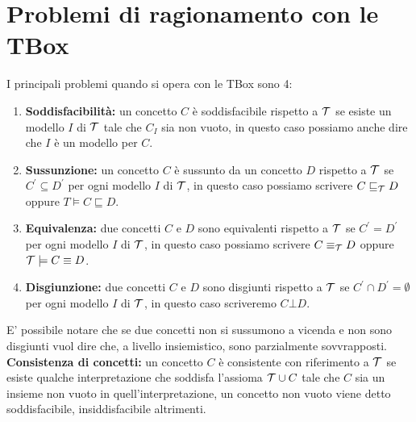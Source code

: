 \documentclass[../main.tex]{subfiles}
\begin{document}
   \section{Problemi di ragionamento con le TBox}
   I principali problemi quando si opera con le TBox sono 4:
   \begin{enumerate}
      \item \textbf{Soddisfacibilità:} un concetto $C$ è soddisfacibile rispetto a $\mathcal{T}$ se esiste un modello $I$ di $\mathcal{T}$ tale che $C_I$ sia non vuoto, in questo caso possiamo anche dire che $I$ è un modello per $C$.
      \item \textbf{Sussunzione:} un concetto $C$ è sussunto da un concetto $D$ rispetto a $\mathcal{T}$ se $C^\prime \subseteq D^\prime$ per ogni modello $I$ di $\mathcal{T}$, in questo caso possiamo scrivere $C \sqsubseteq_{\mathcal{T}} D$ oppure $T \models C \sqsubseteq D$.
      \item \textbf{Equivalenza:} due concetti $C$ e $D$ sono equivalenti rispetto a $\mathcal{T}$ se $C^\prime = D^\prime$ per ogni modello $I$ di $\mathcal{T}$, in questo caso possiamo scrivere $C \equiv_{\mathcal{T}} D$ oppure $\mathcal{T} \models C \equiv D$.
      \item \textbf{Disgiunzione:} due concetti $C$ e $D$ sono disgiunti rispetto a $\mathcal{T}$ se $C^\prime \cap D^\prime = \emptyset$ per ogni modello $I$ di $\mathcal{T}$, in questo caso scriveremo $C \bot D$.
   \end{enumerate}
   E' possibile notare che se due concetti non si sussumono a vicenda e non sono disgiunti vuol dire che, a livello insiemistico, sono parzialmente sovvrapposti.
   \spazio
   \textbf{Consistenza di concetti:} un concetto $C$ è consistente con riferimento a $\mathcal{T}$ se esiste qualche interpretazione che soddisfa l'assioma $\mathcal{T} \cup C$ tale che $C$ sia un insieme non vuoto in quell'interpretazione, un concetto non vuoto viene detto soddisfacibile, insiddisfacibile altrimenti.
   
\end{document}
